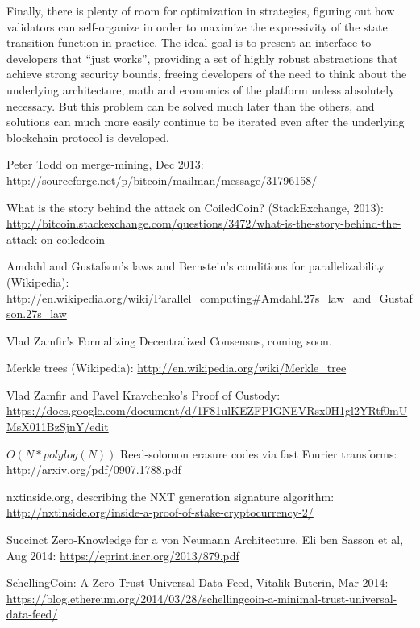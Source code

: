 \documentclass[11pt,a4paper]{report}
\theoremstyle{plain}
\theoremstyle{definition}
\theoremstyle{remark}
\begin{document}
Finally, there is plenty of room for optimization in strategies, figuring out how validators can self-organize in order to maximize the expressivity of the state transition function in practice. The ideal goal is to present an interface to developers that ``just works'', providing a set of highly robust abstractions that achieve strong security bounds, freeing developers of the need to think about the underlying architecture, math and economics of the platform unless absolutely necessary. But this problem can be solved much later than the others, and solutions can much more easily continue to be iterated even after the underlying blockchain protocol is developed.

\begin{thebibliography}{2}

    Peter Todd on merge-mining, Dec 2013: \url{http://sourceforge.net/p/bitcoin/mailman/message/31796158/}

    What is the story behind the attack on CoiledCoin? (StackExchange, 2013): \url{http://bitcoin.stackexchange.com/questions/3472/what-is-the-story-behind-the-attack-on-coiledcoin}

    Amdahl and Gustafson's laws and Bernstein's conditions for parallelizability (Wikipedia): \url{http://en.wikipedia.org/wiki/Parallel_computing#Amdahl.27s_law_and_Gustafson.27s_law}

    Vlad Zamfir's Formalizing Decentralized Consensus, coming soon.

    Merkle trees (Wikipedia): \url{http://en.wikipedia.org/wiki/Merkle_tree}

    Vlad Zamfir and Pavel Kravchenko's Proof of Custody: \url{https://docs.google.com/document/d/1F81ulKEZFPIGNEVRsx0H1gl2YRtf0mUMsX011BzSjnY/edit}

    $O(N*polylog(N))$ Reed-solomon erasure codes via fast Fourier transforms: \url{http://arxiv.org/pdf/0907.1788.pdf}

    nxtinside.org, describing the NXT generation signature algorithm: \url{http://nxtinside.org/inside-a-proof-of-stake-cryptocurrency-2/}

    Succinct Zero-Knowledge for a von Neumann Architecture, Eli ben Sasson et al, Aug 2014: \url{https://eprint.iacr.org/2013/879.pdf}

    SchellingCoin: A Zero-Trust Universal Data Feed, Vitalik Buterin, Mar 2014: \url{https://blog.ethereum.org/2014/03/28/schellingcoin-a-minimal-trust-universal-data-feed/}


\end{thebibliography}
\end{document}
